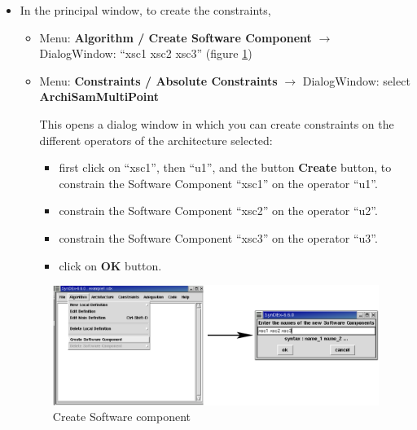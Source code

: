 \documentclass[a4paper,twoside]{report}
\begin{document}
\begin{itemize}
\item In the principal window, to create the constraints,

\begin{itemize}
\item Menu: \textbf{Algorithm / Create Software Component} $\rightarrow$
DialogWindow: ``xsc1 xsc2 xsc3'' (figure \ref{component})

\item Menu: \textbf{Constraints / Absolute Constraints} $\rightarrow$ DialogWindow:
select \textbf{ArchiSamMultiPoint}

This opens a dialog window in which you can create constraints on the different
operators of the architecture selected: 

\begin{itemize}
\item first click on ``xsc1'', then ``u1'', and the button \textbf{Create}
button, to constrain the Software Component ``xsc1'' on the operator ``u1''.
\item constrain the Software Component ``xsc2'' on the operator ``u2''.
\item constrain the Software Component ``xsc3'' on the operator ``u3''.
\item click on \textbf{OK} button.
\end{itemize}

\end{itemize}

\begin{figure}[htbp]
  \begin{center} 
        \includegraphics[width=1.1\linewidth]{create_software_component.eps} 
  \end{center}
  \caption{Create Software component} 
  \label{component}
\end{figure}


\end{itemize}
\end{document}
